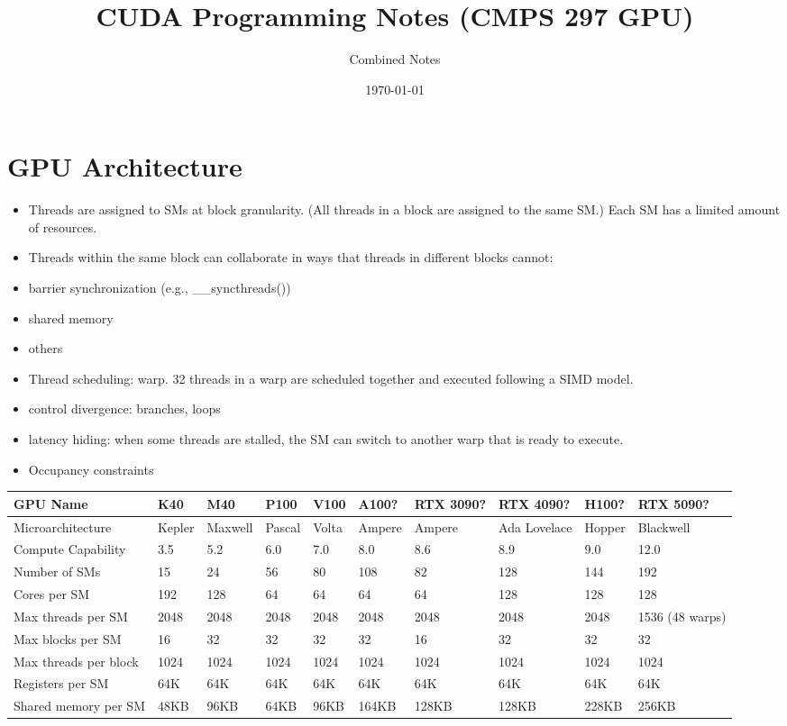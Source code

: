 \documentclass{article}
\title{CUDA Programming Notes (CMPS 297 GPU)}
\author{Combined Notes}
\date{\today}
\begin{document}
\maketitle
\tableofcontents
\newpage
\section{GPU Architecture}

\begin{itemize}
\item Threads are assigned to SMs at block granularity. (All threads in a block are assigned to the same SM.) Each SM has a limited amount of resources.
\item Threads within the same block can collaborate in ways that threads in different blocks cannot:
\item barrier synchronization (e.g., \_\_syncthreads())
\item shared memory
\item others
\item Thread scheduling: warp. 32 threads in a warp are scheduled together and executed following a SIMD model.
\item control divergence: branches, loops
\item latency hiding: when some threads are stalled, the SM can switch to another warp that is ready to execute.
\item Occupancy constraints

\end{itemize}
\begin{longtable}{l|l|l|l|l|l|l|l|l|l}
\hline
GPU Name & K40 & M40 & P100 & V100 & A100? & RTX 3090? & RTX 4090? & H100? & RTX 5090? \\ \hline
Microarchitecture & Kepler & Maxwell & Pascal & Volta & Ampere & Ampere & Ada Lovelace & Hopper & Blackwell \\ \hline
Compute Capability & 3.5 & 5.2 & 6.0 & 7.0 & 8.0 & 8.6 & 8.9 & 9.0 & 12.0 \\ \hline
Number of SMs & 15 & 24 & 56 & 80 & 108 & 82 & 128 & 144 & 192 \\ \hline
Cores per SM & 192 & 128 & 64 & 64 & 64 & 64 & 128 & 128 & 128 \\ \hline
Max threads per SM & 2048 & 2048 & 2048 & 2048 & 2048 & 2048 & 2048 & 2048 & 1536 (48 warps) \\ \hline
Max blocks per SM & 16 & 32 & 32 & 32 & 32 & 16 & 32 & 32 & 32 \\ \hline
Max threads per block & 1024 & 1024 & 1024 & 1024 & 1024 & 1024 & 1024 & 1024 & 1024 \\ \hline
Registers per SM & 64K & 64K & 64K & 64K & 64K & 64K & 64K & 64K & 64K \\ \hline
Shared memory per SM & 48KB & 96KB & 64KB & 96KB & 164KB & 128KB & 128KB & 228KB & 256KB \\ \hline
\end{longtable}
\end{document}

